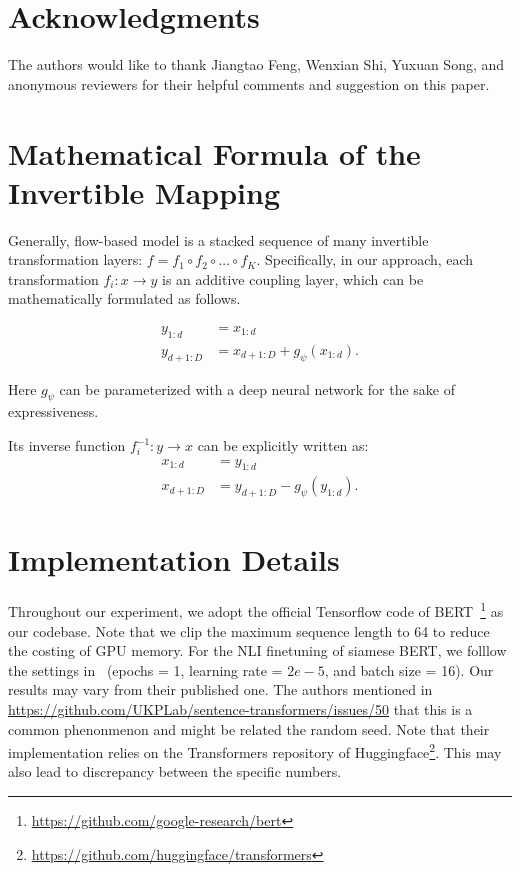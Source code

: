 \documentclass[11pt,a4paper]{article}
\begin{document}
\section*{Acknowledgments}
The authors would like to thank Jiangtao Feng, Wenxian Shi, Yuxuan Song, and anonymous reviewers for their helpful comments and suggestion on this paper.

\newpage



\newpage
\appendix
\onecolumn
\section{Mathematical Formula of the Invertible Mapping}
\label{sec:appendix:additive:coupling}
Generally, flow-based model is a stacked sequence of many invertible transformation layers: $f = f_1 \circ f_2 \circ \ldots \circ f_K$. Specifically, in our approach, each transformation $f_i: x \rightarrow y$ is an additive coupling layer, which can be mathematically formulated as follows.

\begin{align}
    \label{eq:additive:coupling:layer}
    y_{1:d} &= x_{1:d} \\
    y_{d+1:D} &= x_{d+1:D} + g_{\psi}(x_{1:d}). 
\end{align}

Here $g_{\psi}$ can be parameterized with a deep neural network for the sake of expressiveness. 

Its inverse function $f_i^{-1}: y \rightarrow x$ can be explicitly written as:
\begin{align}
    \label{eq:additive:coupling:layer:inverse}
    x_{1:d} &= y_{1:d} \\
    x_{d+1:D} &= y_{d+1:D} - g_{\psi}(y_{1:d}) .
\end{align}

\section{Implementation Details}
\label{sec:appendix:implementation}

Throughout our experiment, we adopt the official Tensorflow code of BERT~\footnote{\url{https://github.com/google-research/bert}} as our codebase. Note that we clip the maximum sequence length to 64 to reduce the costing of GPU memory. For the NLI finetuning of siamese BERT, we folllow the settings in~\citep{reimers2019sentence} (epochs = 1,  learning rate = $2e-5$, and batch size = 16). Our results may vary from their published one. The authors mentioned in \url{https://github.com/UKPLab/sentence-transformers/issues/50} that this is a common phenonmenon and might be related the random seed. Note that their implementation relies on the Transformers repository of Huggingface\footnote{\url{https://github.com/huggingface/transformers}}. This may also lead to discrepancy between the specific numbers.
\end{document}
